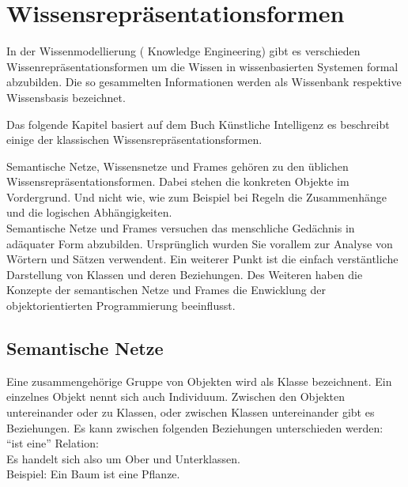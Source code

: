 \chapter{Wissensrepräsentationsformen}
\label{chap:wissensrepFormen}


In der Wissenmodellierung ( Knowledge Engineering) gibt es verschieden Wissenrepräsentationsformen um die Wissen in wissenbasierten Systemen formal abzubilden. Die so gesammelten Informationen werden als Wissenbank respektive Wissensbasis bezeichnet.~\cite{wikiWissensrep}

Das folgende Kapitel basiert auf dem Buch Künstliche Intelligenz\cite{laemmel} es beschreibt einige der klassischen Wissensrepräsentationsformen.

Semantische Netze, Wissensnetze und Frames gehören zu den üblichen Wissensrepräsentationsformen. Dabei stehen die konkreten Objekte im Vordergrund. Und nicht wie, wie zum Beispiel bei Regeln die Zusammenhänge und die logischen Abhängigkeiten.\\

Semantische Netze und Frames versuchen das menschliche Gedächnis in adäquater Form abzubilden. Ursprünglich wurden Sie vorallem zur Analyse von Wörtern und Sätzen verwendent. Ein weiterer Punkt ist die einfach verstäntliche Darstellung von Klassen und deren Beziehungen. Des Weiteren haben die Konzepte der semantischen Netze und Frames die Enwicklung der objektorientierten Programmierung beeinflusst.



\section{Semantische Netze}
\label{sec:wissensrepFormen_semantischeNetze}

Eine zusammengehörige Gruppe von Objekten wird als Klasse bezeichnent. Ein einzelnes Objekt nennt sich auch Individuum. Zwischen den Objekten untereinander oder zu Klassen, oder zwischen Klassen untereinander gibt es Beziehungen. Es kann zwischen folgenden Beziehungen unterschieden werden:\\

"`ist eine"' Relation: \\
\noindent\hspace*{15mm} Es handelt sich also um Ober und Unterklassen.\\ 
\noindent\hspace*{15mm} Beispiel: Ein Baum ist eine Pflanze.\\

